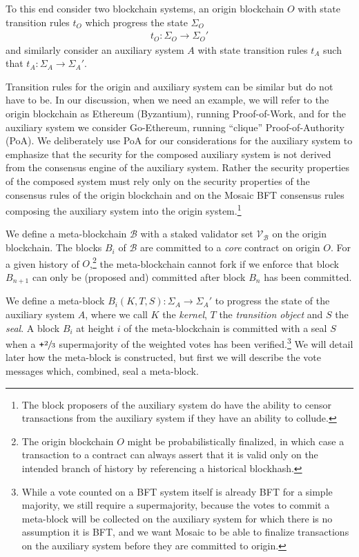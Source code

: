 \documentclass[12pt,a4paper]{article}
\begin{document}
To this end consider two blockchain systems, an origin blockchain $O$ with state transition rules $t_O$ which progress the state $\Sigma_O$ 
\begin{align} \label{state_transition_rules}
  t_O : \Sigma_O \rightarrow \Sigma_O'
\end{align}
and similarly consider an auxiliary system $A$ with state transition rules $t_A$ such that $t_A : \Sigma_A \rightarrow \Sigma_A'$.


Transition rules for the origin and auxiliary system can be similar but do not have to be.
In our discussion, when we need an example, we will refer to the origin blockchain as Ethereum (Byzantium), running Proof-of-Work, and for the auxiliary system we consider Go-Ethereum, running ``clique'' Proof-of-Authority (PoA).
We deliberately use PoA for our considerations for the auxiliary system to emphasize that the security for the composed auxiliary system is not derived from the consensus engine of the auxiliary system.
Rather the security properties of the composed system must rely only on the security properties of the consensus rules of the origin blockchain and on the Mosaic BFT consensus rules composing the auxiliary system into the origin system.\footnote{
	The block proposers of the auxiliary system do have the ability to censor transactions from the auxiliary system if they have an ability to collude.
}

We define a meta-blockchain $\mathcal{B}$ with a staked validator set $\mathcal{V}_\mathcal{B}$ on the origin blockchain. The blocks $B_i$ of $\mathcal{B}$ are committed to a \emph{core} contract on origin $O$.
For a given history of $O$,\footnote{
	The origin blockchain $O$ might be probabilistically finalized, in which case a transaction to a contract can always assert that it is valid only on the intended branch of history by referencing a historical blockhash.
}
the meta-blockchain cannot fork if we enforce that block $B_{n+1}$ can only be (proposed and) committed after block $B_n$ has been committed.

We define a meta-block $B_i(K, T, S): \Sigma_A \rightarrow \Sigma_A'$ to progress the state of the auxiliary system $A$, where we call $K$ the \emph{kernel}, $T$ the \emph{transition object} and $S$ the \emph{seal}.
A block $B_i$ at height $i$ of the meta-blockchain is committed with a seal $S$ when a $\texttt{+}\sfrac{2}{3}$ supermajority of the weighted votes has been verified.\footnote{
	While a vote counted on a BFT system itself is already BFT for a simple majority, %
	we still require a supermajority, because the votes to commit a meta-block will be collected on the auxiliary system for which there is no assumption it is BFT, and we want Mosaic to be able to finalize transactions on the auxiliary system before they are committed to origin.
}
We will detail later how the meta-block is constructed, but first we will describe the vote messages which, combined, seal a meta-block.
\end{document}
